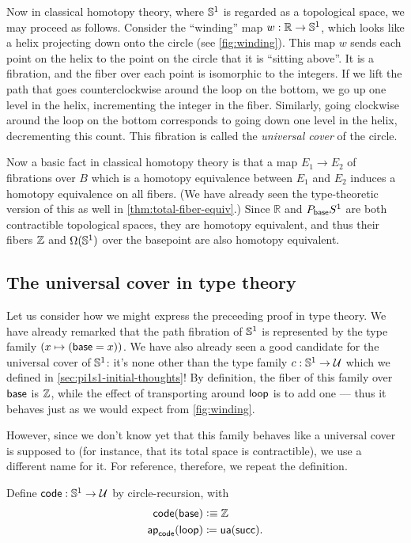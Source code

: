 Now in classical homotopy theory, where $\mathbb{S}^1$ is regarded as a topological space, we may proceed as follows.
Consider the ``winding'' map $w:\mathbb{R}\to \mathbb{S} ^1$, which looks like a helix projecting down onto the circle (see \autoref{fig:winding}).
This map $w$ sends each point on the helix to the point on the circle that it is ``sitting above''.
It is a fibration, and the fiber over each point is isomorphic to the integers.
If we lift the path that goes counterclockwise around the loop on the bottom, we go up one level in the helix, incrementing the integer in the fiber.
Similarly, going clockwise around the loop on the bottom corresponds to going down one level in the helix, decrementing this count.
This fibration is called the \emph{universal cover} of the circle.

Now a basic fact in classical homotopy theory is that a map $E_1\to E_2$ of fibrations over $B$ which is a homotopy equivalence between $E_1$ and $E_2$ induces a homotopy equivalence on all fibers.
(We have already seen the type-theoretic version of this as well in \autoref{thm:total-fiber-equiv}.)
Since $\mathbb{R}$ and $P_{\mathsf{base}} S^1$ are both contractible topological spaces, they are homotopy equivalent, and thus their fibers $\mathbb{Z}$ and $\Omega(\mathbb{S} ^1)$ over the basepoint are also homotopy equivalent.

\subsection{The universal cover in type theory}
\label{sec:pi1s1-universal-cover}

Let us consider how we might express the preceeding proof in type theory.
We have already remarked that the path fibration of $\mathbb{S}^1$ is represented by the type family $(x\mapsto (\mathsf{base}=x))$.
We have also already seen a good candidate for the universal cover of $\mathbb{S}^1$: it's none other than the type family $c:\mathbb{S}^1\to\mathcal{U}$ which we defined in \autoref{sec:pi1s1-initial-thoughts}!
By definition, the fiber of this family over $\mathsf{base}$ is $\mathbb{Z}$, while the effect of transporting around $\mathsf{loop}$ is to add one --- thus it behaves just as we would expect from \autoref{fig:winding}.

However, since we don't know yet that this family behaves like a universal cover is supposed to (for instance, that its total space is contractible), we use a different name for it.
For reference, therefore, we repeat the definition.

\begin{defn} \label{S1-universal-cover}
  Define $\mathsf{code} : \mathbb{S} ^1 \to \mathcal{U}$ by circle-recursion, with 
  \begin{align*}
    \mathsf{code}(\mathsf{base}) &\vcentcolon\equiv \mathbb{Z} \\
    \mathsf{ap}_{\mathsf{code}}({\mathsf{loop}}) &\coloneqq \mathsf{ua}(\mathsf{succ}).
  \end{align*}
\end{defn}

